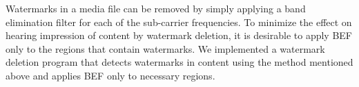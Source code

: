 Watermarks in a media file can be removed by simply applying a band elimination filter for each of the sub-carrier frequencies.
To minimize the effect on hearing impression of content by watermark deletion, it is desirable to apply BEF only to the regions that contain watermarks.
We implemented a watermark deletion program that detects watermarks in content using the method mentioned above and applies BEF only to necessary regions.
